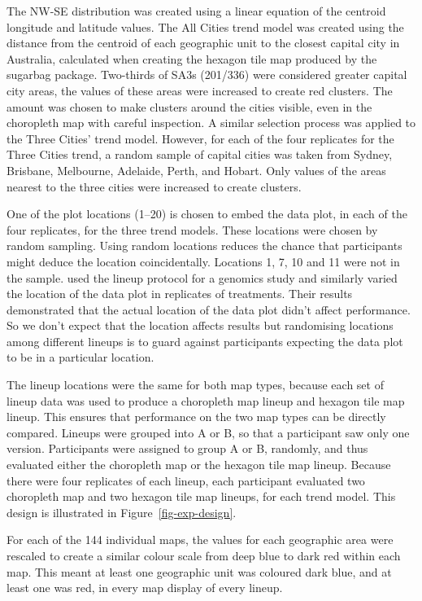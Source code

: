 \documentclass[
doublespace,
  times]{anzsauth}
\begin{document}
The NW-SE distribution was created using a linear equation of the
centroid longitude and latitude values. The All Cities trend model was
created using the distance from the centroid of each geographic unit to
the closest capital city in Australia, calculated when creating the
hexagon tile map produced by the \textsf{sugarbag} \citep{sugarbag}
package. Two-thirds of SA3s (201/336) were considered greater capital
city areas, the values of these areas were increased to create red
clusters. The amount was chosen to make clusters around the cities
visible, even in the choropleth map with careful inspection. A similar
selection process was applied to the Three Cities' trend model. However,
for each of the four replicates for the Three Cities trend, a random
sample of capital cities was taken from Sydney, Brisbane, Melbourne,
Adelaide, Perth, and Hobart. Only values of the areas nearest to the
three cities were increased to create clusters.

One of the plot locations (1--20) is chosen to embed the data plot, in
each of the four replicates, for the three trend models. These locations
were chosen by random sampling. Using random locations reduces the
chance that participants might deduce the location coincidentally.
Locations 1, 7, 10 and 11 were not in the sample. \citet{YMCCSG} used
the lineup protocol for a genomics study and similarly varied the
location of the data plot in replicates of treatments. Their results
demonstrated that the actual location of the data plot didn't affect
performance. So we don't expect that the location affects results but
randomising locations among different lineups is to guard against
participants expecting the data plot to be in a particular location.

The lineup locations were the same for both map types, because each set
of lineup data was used to produce a choropleth map lineup and hexagon
tile map lineup. This ensures that performance on the two map types can
be directly compared. Lineups were grouped into A or B, so that a
participant saw only one version. Participants were assigned to group A
or B, randomly, and thus evaluated either the choropleth map or the
hexagon tile map lineup. Because there were four replicates of each
lineup, each participant evaluated two choropleth map and two hexagon
tile map lineups, for each trend model. This design is illustrated in
Figure~\ref{fig-exp-design}.

For each of the 144 individual maps, the values for each geographic area
were rescaled to create a similar colour scale from deep blue to dark
red within each map. This meant at least one geographic unit was
coloured dark blue, and at least one was red, in every map display of
every lineup.
\end{document}
